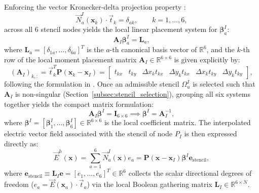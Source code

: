\documentclass[VANCOUVER,Times1COL]{WileyNJD-v5}
\begin{document}
Enforcing the vector Kronecker-delta projection property \cite{stable_vnmm2d_2026}:
\begin{equation}
    \vec{N}_a^I(\mathbf{x}_k) \cdot \vec{t}_k = \delta_{ak}, \qquad k = 1, \dots, 6,
    \label{eq:kronecker_projection}
\end{equation}
across all 6 stencil nodes yields the local linear placement system for $\boldsymbol{\beta}_a^I$:
\begin{equation}
    \mathbf{A}_I \boldsymbol{\beta}_a^I = \mathbf{L}_a,
    \label{eq:collocation_system}
\end{equation}
where $\mathbf{L}_a = [\delta_{1a}, \dots, \delta_{6a}]^T$ is the $a$-th canonical basis vector of $\mathbb{R}^6$, and the $k$-th row of the local moment placement matrix $\mathbf{A}_I \in \mathbb{R}^{6 \times 6}$ is given explicitly by:
\begin{equation}
    (\mathbf{A}_I)_{k, :} = \vec{t}_k^T \mathbf{P}(\mathbf{x}_k - \mathbf{x}_I) = \begin{bmatrix} t_{kx} & t_{ky} & \Delta x_k t_{kx} & \Delta y_k t_{kx} & \Delta x_k t_{ky} & \Delta y_k t_{ky} \end{bmatrix},
    \label{eq:matrix_A_row}
\end{equation}
following the formulation in \cite{stable_vnmm2d_2026}.
Once an admissible stencil $\Omega_u^I$ is selected such that $\mathbf{A}_I$ is non-singular (Section~\ref{subsec:stencil_selection}), grouping all six systems together yields the compact matrix formulation:
\begin{equation}
    \mathbf{A}_I \boldsymbol{\beta}^I = \mathbf{I}_{6 \times 6} \implies \boldsymbol{\beta}^I = \mathbf{A}_I^{-1},
    \label{eq:beta_matrix_inversion}
\end{equation}
where $\boldsymbol{\beta}^I = [\boldsymbol{\beta}_1^I, \dots, \boldsymbol{\beta}_6^I] \in \mathbb{R}^{6 \times 6}$ is the local coefficient matrix. The interpolated electric vector field associated with the stencil of node $P_I$ is then expressed directly as:
\begin{equation}
    \vec{E}^h(\mathbf{x}) = \sum_{a=1}^6 \vec{N}_a^I(\mathbf{x}) e_a = \mathbf{P}(\mathbf{x} - \mathbf{x}_I) \boldsymbol{\beta}^I \mathbf{e}_{\mathrm{stencil}},
    \label{eq:field_interpolation_mlpg}
\end{equation}
where $\mathbf{e}_{\mathrm{stencil}} \equiv \mathbf{L}_I \mathbf{e} = [e_1, \dots, e_6]^T \in \mathbb{R}^6$ collects the scalar directional degrees of freedom ($e_a = \vec{E}(\mathbf{x}_a) \cdot \vec{t}_a$) via the local Boolean gathering matrix $\mathbf{L}_I \in \mathbb{R}^{6 \times N}$.
\end{document}

